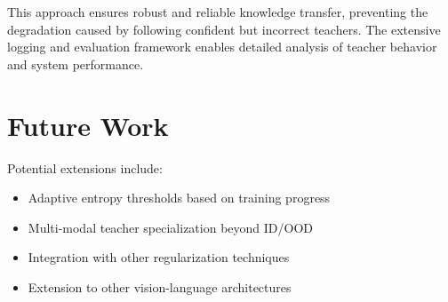 \documentclass[11pt,a4paper]{article}
\begin{document}
This approach ensures robust and reliable knowledge transfer, preventing the degradation caused by following confident but incorrect teachers. The extensive logging and evaluation framework enables detailed analysis of teacher behavior and system performance.

\section{Future Work}

Potential extensions include:
\begin{itemize}
\item Adaptive entropy thresholds based on training progress
\item Multi-modal teacher specialization beyond ID/OOD
\item Integration with other regularization techniques
\item Extension to other vision-language architectures
\end{itemize}
\end{document}
